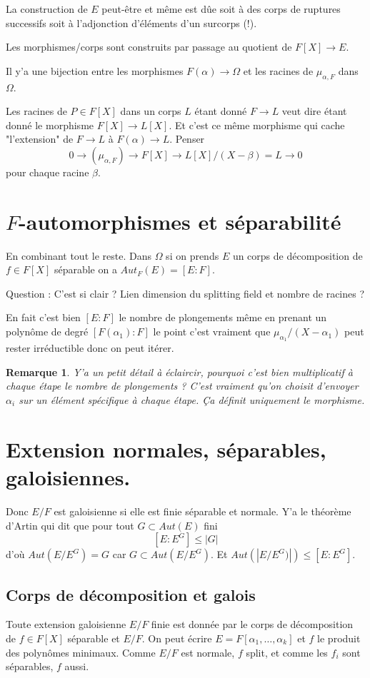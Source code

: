 \documentclass[a4paper,12pt]{book}
\theoremstyle{plain}
\newtheorem{rem}{Remarque}
\theoremstyle{definition}
\theoremstyle{remark}
\begin{document}
La construction de $E$ peut-être et même est dûe soit à des corps
de ruptures successifs soit à l'adjonction d'éléments d'un 
surcorps (!).

Les morphismes/corps sont construits par passage au quotient de
$F[X]\to E$.

Il y'a une bijection entre les morphismes $F(\alpha)\to \Omega$
et les racines de $\mu_{\alpha,F}$ dans $\Omega$.

Les racines de $P\in F[X]$ dans un corps $L$ étant donné $F\to L$
veut dire étant donné le morphisme $F[X]\to L[X]$. Et c'est ce 
même morphisme qui cache "l'extension" de $F\to L$ à $F(\alpha)
\to L$. Penser 
\[0\to (\mu_{\alpha,F})\to F[X]\to L[X]/(X-\beta)=L\to 0\]
pour chaque racine $\beta$.

\section{$F$-automorphismes et séparabilité}
En combinant tout le reste. Dans $\Omega$ si on prends 
$E$ un corps de décomposition de $f\in F[X]$ séparable on a
$Aut_F(E)=[E:F]$.

Question : C'est si clair ? Lien dimension du splitting field et
nombre de racines ?

\noindent En fait c'est bien $[E:F]$ le nombre de plongements même
en prenant un polynôme de degré $[F(\alpha_1):F]$ le point c'est
vraiment que $\mu_{\alpha_1}/(X-\alpha_1)$ peut rester irréductible
donc on peut itérer.

\begin{rem}
  Y'a un petit détail à éclaircir, pourquoi c'est bien 
  multiplicatif à chaque étape le nombre de plongements ? C'est
  vraiment qu'on choisit d'envoyer $\alpha_i$ sur un élément
  spécifique à chaque étape. Ça définit uniquement le morphisme.
\end{rem}

\section{Extension normales, séparables, galoisiennes.}
Donc $E/F$ est galoisienne si elle est finie séparable et normale.
Y'a le théorème d'Artin qui dit que pour tout $G\subset Aut(E)$
fini
\[[E:E^G]\leq |G|\]
d'où $Aut(E/E^G)=G$ car $G\subset Aut(E/E^G)$. Et 
$Aut(|E/E^G)|)\leq [E:E^G]$. 
\subsection{Corps de décomposition et galois}
Toute extension galoisienne $E/F$ finie est donnée par le corps
de décomposition de $f\in F[X]$ séparable et $E/F$. On peut écrire
$E=F[\alpha_1,\ldots,\alpha_k]$ et $f$ le produit des polynômes
minimaux. Comme $E/F$ est normale, $f$ split, et comme les $f_i$
sont séparables, $f$ aussi. 
\end{document}
